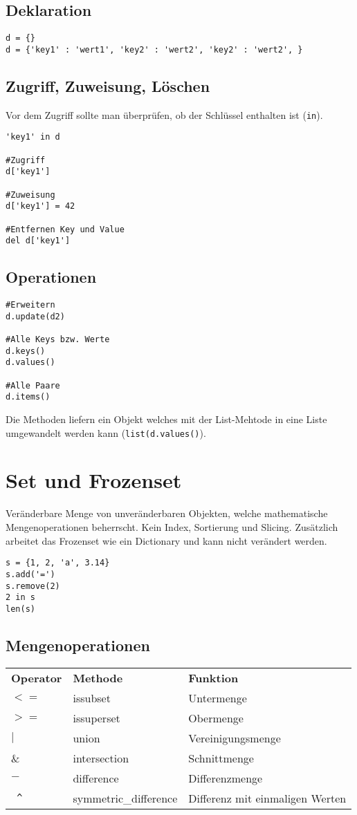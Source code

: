 \subsection{Deklaration}
\begin{lstlisting}
d = {}
d = {'key1' : 'wert1', 'key2' : 'wert2', 'key2' : 'wert2', }
\end{lstlisting}
\subsection{Zugriff, Zuweisung, Löschen}
Vor dem Zugriff sollte man überprüfen, ob der Schlüssel enthalten ist (\texttt{in}).
\begin{lstlisting}
'key1' in d

#Zugriff
d['key1']

#Zuweisung
d['key1'] = 42

#Entfernen Key und Value
del d['key1']
\end{lstlisting}
\subsection{Operationen}
\begin{lstlisting}
#Erweitern
d.update(d2)

#Alle Keys bzw. Werte
d.keys()
d.values()

#Alle Paare
d.items()
\end{lstlisting}
Die Methoden liefern ein Objekt welches mit der List-Mehtode in eine Liste umgewandelt werden kann (\texttt{list(d.values()}).
\section{Set und Frozenset}
Veränderbare Menge von unveränderbaren Objekten, welche mathematische Mengenoperationen beherrscht. Kein Index, Sortierung und Slicing.  Zusätzlich arbeitet das Frozenset wie ein Dictionary und kann nicht verändert werden.
\begin{lstlisting}
s = {1, 2, 'a', 3.14}
s.add('=')
s.remove(2)
2 in s
len(s)
\end{lstlisting}
\subsection{Mengenoperationen}
\begin{tabular}{lp{4cm}p{6cm}}
\textbf{Operator}	&\textbf{Methode}	&\textbf{Funktion}\\
$<=$		&issubset			&Untermenge\\
$>=$		&issuperset		&Obermenge\\
$\mid$	&union			&Vereinigungsmenge\\
\&		&intersection		&Schnittmenge\\
$-$		&difference		&Differenzmenge\\
\texttt{ \^{} }	&symmetric\_difference	&Differenz mit einmaligen Werten
\end{tabular}
